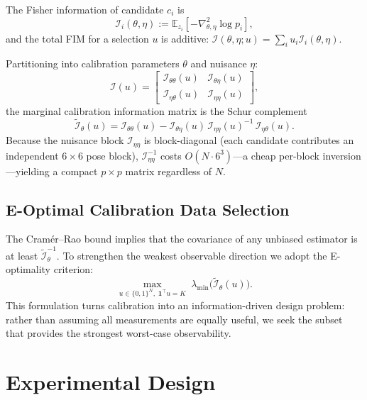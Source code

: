 \documentclass[11pt]{article}
\begin{document}
The Fisher information of candidate $c_i$ is
\begin{equation}
\mathcal I_i(\theta,\eta)
:= \mathbb E_{z_i}\!\left[-\nabla^2_{\theta,\eta}\log p_i\right],
\end{equation}
and the total FIM for a selection $u$ is additive:
$\mathcal I(\theta,\eta;u) = \sum_{i} u_i \mathcal I_i(\theta,\eta)$.

Partitioning into calibration parameters $\theta$ and nuisance $\eta$:
\begin{equation}
\mathcal I(u) =
\begin{bmatrix}
\mathcal I_{\theta\theta}(u) & \mathcal I_{\theta\eta}(u) \\
\mathcal I_{\eta\theta}(u) & \mathcal I_{\eta\eta}(u)
\end{bmatrix},
\end{equation}
the marginal calibration information matrix is the Schur complement
\begin{equation}
\widetilde{\mathcal I}_{\theta}(u)
= \mathcal I_{\theta\theta}(u)
- \mathcal I_{\theta\eta}(u)\,\mathcal I_{\eta\eta}(u)^{-1}\,\mathcal I_{\eta\theta}(u).
\label{eq:schur}
\end{equation}
Because the nuisance block $\mathcal I_{\eta\eta}$ is block-diagonal (each
candidate contributes an independent $6\times6$ pose block),
$\mathcal I_{\eta\eta}^{-1}$ costs $O(N \cdot 6^3)$---a cheap per-block
inversion---yielding a compact $p\times p$ matrix regardless of $N$.

\subsection{E-Optimal Calibration Data Selection}

The Cram\'er--Rao bound implies that the covariance of any unbiased estimator
is at least $\widetilde{\mathcal I}_{\theta}^{-1}$.
To strengthen the weakest observable direction we adopt the E-optimality
criterion:
\begin{equation}
\max_{u \in \{0,1\}^N,\;\mathbf{1}^\top u = K}
\;\lambda_{\min}\!\bigl(\widetilde{\mathcal I}_{\theta}(u)\bigr).
\label{eq:e_opt}
\end{equation}
This formulation turns calibration into an information-driven design problem:
rather than assuming all measurements are equally useful, we seek the subset
that provides the strongest worst-case observability.

\section{Experimental Design}
\label{sec:experiments}
\end{document}
